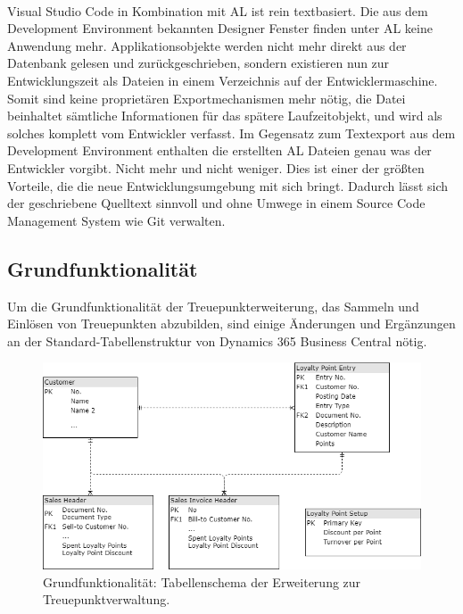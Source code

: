 \paragraph{}
Visual Studio Code in Kombination mit AL ist rein textbasiert. Die aus dem Development Environment bekannten Designer Fenster finden unter AL keine Anwendung mehr. Applikationsobjekte werden nicht mehr direkt aus der Datenbank gelesen und zurückgeschrieben, sondern existieren nun zur Entwicklungszeit als Dateien in einem Verzeichnis auf der Entwicklermaschine. Somit sind keine proprietären Exportmechanismen mehr nötig, die Datei beinhaltet sämtliche Informationen für das spätere Laufzeitobjekt, und wird als solches komplett vom Entwickler verfasst. Im Gegensatz zum Textexport aus dem Development Environment enthalten die erstellten AL Dateien genau was der Entwickler vorgibt. Nicht mehr und nicht weniger. Dies ist einer der größten Vorteile, die die neue Entwicklungsumgebung mit sich bringt. Dadurch lässt sich der geschriebene Quelltext sinnvoll und ohne Umwege in einem Source Code Management System wie Git verwalten.

\pagebreak
\subsection{Grundfunktionalität}
\label{KeyFunctionality}
Um die Grundfunktionalität der Treuepunkterweiterung, das Sammeln und Einlösen von Treuepunkten abzubilden, sind einige Änderungen und Ergänzungen an der Standard-Tabellenstruktur von Dynamics 365 Business Central nötig. 

\begin{figure}[h]
	\centering
	\includegraphics[width=130mm]{images/Tables}
	\caption{Grundfunktionalität: Tabellenschema der Erweiterung zur Treuepunktverwaltung.}
	\label{fig:Tables}
\end{figure}

